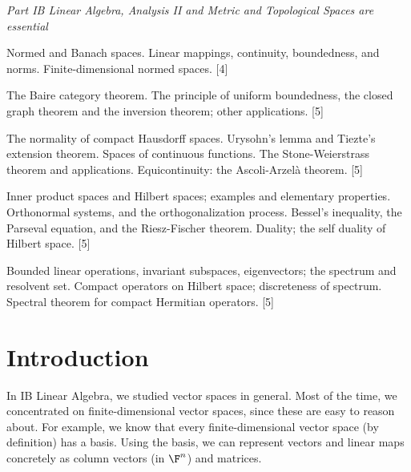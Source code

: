\documentclass[a4paper]{article}
\begin{document}
\maketitle
{\small
\noindent\emph{Part IB Linear Algebra, Analysis II and Metric and Topological Spaces are essential}
\vspace{10pt}

\noindent Normed and Banach spaces. Linear mappings, continuity, boundedness, and norms. Finite-dimensional normed spaces.\hspace*{\fill} [4]

\vspace{5pt}
\noindent The Baire category theorem. The principle of uniform boundedness, the closed graph theorem and the inversion theorem; other applications.\hspace*{\fill} [5]

\vspace{5pt}
\noindent The normality of compact Hausdorff spaces. Urysohn's lemma and Tiezte's extension theorem. Spaces of continuous functions. The Stone-Weierstrass theorem and applications. Equicontinuity: the Ascoli-Arzel\`a theorem.\hspace*{\fill} [5]

\vspace{5pt}
\noindent Inner product spaces and Hilbert spaces; examples and elementary properties. Orthonormal systems, and the orthogonalization process. Bessel's inequality, the Parseval equation, and the Riesz-Fischer theorem. Duality; the self duality of Hilbert space.\hspace*{\fill} [5]

\vspace{5pt}
\noindent Bounded linear operations, invariant subspaces, eigenvectors; the spectrum and resolvent set. Compact operators on Hilbert space; discreteness of spectrum. Spectral theorem for compact Hermitian operators.\hspace*{\fill} [5]}

\tableofcontents

\setcounter{section}{-1}
\section{Introduction}
In IB Linear Algebra, we studied vector spaces in general. Most of the time, we concentrated on finite-dimensional vector spaces, since these are easy to reason about. For example, we know that every finite-dimensional vector space (by definition) has a basis. Using the basis, we can represent vectors and linear maps concretely as column vectors (in $\F^n$) and matrices.
\end{document}

